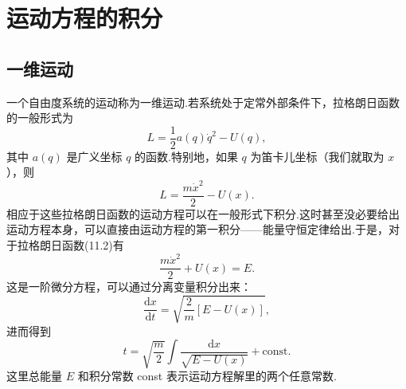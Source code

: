 \chapter{运动方程的积分}

\section{一维运动}

一个自由度系统的运动称为一维运动.若系统处于定常外部条件下，拉格朗日函数的一般形式为
\begin{equation}
  L=\frac{1}{2}a(q)\dot{q}^2-U(q),
\end{equation}
其中 $a(q)$ 是广义坐标 $q$ 的函数.特别地，如果 $q$ 为笛卡儿坐标（我们就取为 $x$），则
\begin{equation}
  L=\frac{m\dot{x}^2}{2}-U(x).
\end{equation}
相应于这些拉格朗日函数的运动方程可以在一般形式下积分.这时甚至没必要给出运动方程本身，可以直接由运动方程的第一积分——能量守恒定律给出.于是，对于拉格朗日函数(11.2)有
\begin{equation*}
  \frac{m\dot{x}^2}{2}+U(x)=E.
\end{equation*}
这是一阶微分方程，可以通过分离变量积分出来：
\begin{equation*}
  \frac{\mathrm{d}x}{\mathrm{d}t}
  =\sqrt{\frac{2}{m}\left[E-U(x)\right]},
\end{equation*}
进而得到
\begin{equation}
  t=\sqrt{\frac{m}{2}}\int\frac{\mathrm{d}x}{\sqrt{E-U(x)}}
  +\mathrm{const}.
\end{equation}
这里总能量 $E$ 和积分常数 const 表示运动方程解里的两个任意常数.

